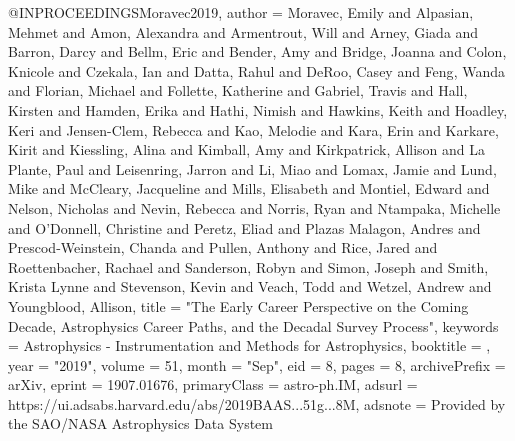 @INPROCEEDINGS{Moravec2019,
       author = {{Moravec}, Emily and {Alpasian}, Mehmet and {Amon}, Alexandra and
         {Armentrout}, Will and {Arney}, Giada and {Barron}, Darcy and
         {Bellm}, Eric and {Bender}, Amy and {Bridge}, Joanna and
         {Colon}, Knicole and {Czekala}, Ian and {Datta}, Rahul and
         {DeRoo}, Casey and {Feng}, Wanda and {Florian}, Michael and
         {Follette}, Katherine and {Gabriel}, Travis and {Hall}, Kirsten and
         {Hamden}, Erika and {Hathi}, Nimish and {Hawkins}, Keith and
         {Hoadley}, Keri and {Jensen-Clem}, Rebecca and {Kao}, Melodie and
         {Kara}, Erin and {Karkare}, Kirit and {Kiessling}, Alina and
         {Kimball}, Amy and {Kirkpatrick}, Allison and {La Plante}, Paul and
         {Leisenring}, Jarron and {Li}, Miao and {Lomax}, Jamie and
         {Lund}, Mike and {McCleary}, Jacqueline and {Mills}, Elisabeth and
         {Montiel}, Edward and {Nelson}, Nicholas and {Nevin}, Rebecca and
         {Norris}, Ryan and {Ntampaka}, Michelle and {O'Donnell}, Christine and
         {Peretz}, Eliad and {Plazas Malagon}, Andres and
         {Prescod-Weinstein}, Chanda and {Pullen}, Anthony and {Rice}, Jared and
         {Roettenbacher}, Rachael and {Sanderson}, Robyn and {Simon}, Joseph and
         {Smith}, Krista Lynne and {Stevenson}, Kevin and {Veach}, Todd and
         {Wetzel}, Andrew and {Youngblood}, Allison},
        title = "{The Early Career Perspective on the Coming Decade, Astrophysics Career Paths, and the Decadal Survey Process}",
     keywords = {Astrophysics - Instrumentation and Methods for Astrophysics},
    booktitle = {\baas},
         year = "2019",
       volume = {51},
        month = "Sep",
          eid = {8},
        pages = {8},
archivePrefix = {arXiv},
       eprint = {1907.01676},
 primaryClass = {astro-ph.IM},
       adsurl = {https://ui.adsabs.harvard.edu/abs/2019BAAS...51g...8M},
      adsnote = {Provided by the SAO/NASA Astrophysics Data System}
}
